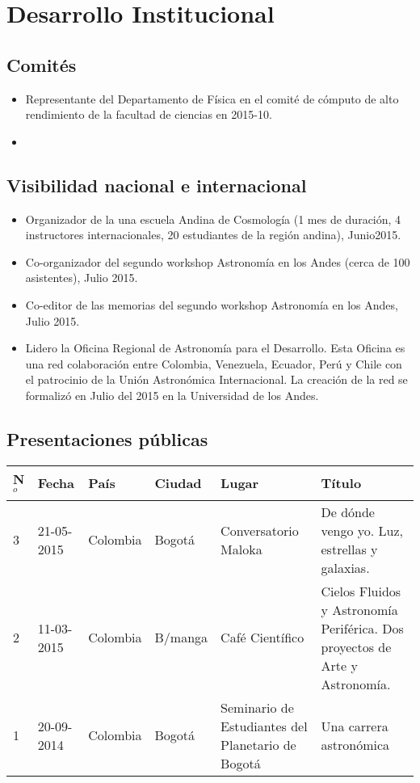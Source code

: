 \documentclass{article}
\begin{document}
\section{Desarrollo Institucional}

\subsection{Comit\'es}
\begin{itemize}
\item {Representante del Departamento de F\'isica en el comit\'e
  de c\'omputo de alto rendimiento de la facultad de ciencias en 2015-10}.
\item {}
\end{itemize}


\subsection{Visibilidad nacional e internacional}
\begin{itemize}
\item {Organizador de la una escuela Andina de Cosmolog\'ia (1 mes de
  duraci\'on, 4 instructores internacionales, 20 estudiantes de la
  regi\'on andina), Junio2015.}
\item {Co-organizador del segundo workshop Astronom\'ia en los Andes
  (cerca de 100 asistentes), Julio 2015.}
\item {Co-editor de las memorias del segundo workshop Astronom\'ia en
  los Andes, Julio 2015.}
\item {Lidero la Oficina Regional de Astronom\'ia para el
  Desarrollo. Esta Oficina es una red colaboraci\'on entre Colombia,
  Venezuela, Ecuador, Per\'u y Chile con el patrocinio de la Uni\'on
  Astron\'omica Internacional. La creaci\'on de la red se formaliz\'o
  en Julio del 2015 en la Universidad de los Andes.}   
\end{itemize}

\subsection{Presentaciones p\'ublicas}

\begin{tabular}{l l l l p{3cm} p{4cm}}\hline
N$^{o}$ & Fecha & Pa\'is & Ciudad & Lugar & T\'itulo\\\hline
3 & 21-05-2015 & Colombia & Bogot\'a & Conversatorio Maloka & De d\'onde vengo yo. Luz, estrellas y galaxias.\\
2 & 11-03-2015 & Colombia & B/manga & Caf\'e Cient\'ifico & Cielos Fluidos y Astronom\'ia Perif\'erica. Dos proyectos de Arte y Astronom\'ia.\\
1 & 20-09-2014 & Colombia & Bogot\'a & Seminario de Estudiantes del
Planetario de Bogot\'a& Una carrera astron\'omica \\\hline
\end{tabular}
\end{document}

